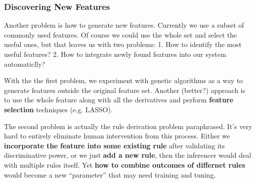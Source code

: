 \subsubsection{Discovering New Features}

Another problem is how to generate new features. Currently we use a subset of commonly used features. Of course we could use the whole set and select the useful ones, but that leaves us with two problems: 1. How to identify the most useful features? 2. How to integrate newly found features into our system automaticlly?

With the the first problem, we experiment with genetic algorithms as a way to generate features outside the original feature set. Another (better?) approach is to use the whole feature along with all the derivatives and perform \textbf{feature selection} techniques (e.g. LASSO).

The second problem is actually the rule derivation problem paraphrased. It's very hard to entirely eliminate human intervention from this process. Either we \textbf{incorporate the feature into some existing rule} after validating its discriminative power, or we just \textbf{add a new rule}, then the inferencer would deal with multiple rules itself. Yet \textbf{how to combine outcomes of differnet rules} would become a new ``parameter'' that may need training and tuning.
